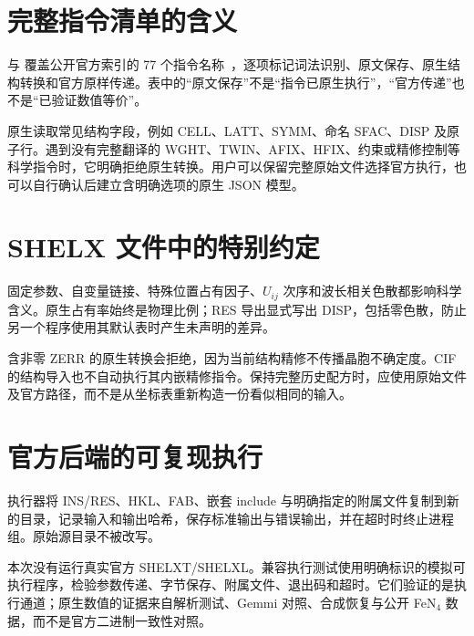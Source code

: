 \section{完整指令清单的含义}
 与  覆盖公开官方索引的 77 个指令名称~\cite{shelxl_instructions}，逐项标记词法识别、原文保存、原生结构转换和官方原样传递。表中的“原文保存”不是“指令已原生执行”，“官方传递”也不是“已验证数值等价”。

原生读取常见结构字段，例如 CELL、LATT、SYMM、命名 SFAC、DISP 及原子行。遇到没有完整翻译的 WGHT、TWIN、AFIX、HFIX、约束或精修控制等科学指令时，它明确拒绝原生转换。用户可以保留完整原始文件选择官方执行，也可以自行确认后建立含明确选项的原生 JSON 模型。

\section{SHELX 文件中的特别约定}
固定参数、自变量链接、特殊位置占有因子、$U_{ij}$ 次序和波长相关色散都影响科学含义。原生占有率始终是物理比例；RES 导出显式写出 DISP，包括零色散，防止另一个程序使用其默认表时产生未声明的差异。

含非零 ZERR 的原生转换会拒绝，因为当前结构精修不传播晶胞不确定度。CIF 的结构导入也不自动执行其内嵌精修指令。保持完整历史配方时，应使用原始文件及官方路径，而不是从坐标表重新构造一份看似相同的输入。

\section{官方后端的可复现执行}
执行器将 INS/RES、HKL、FAB、嵌套 include 与明确指定的附属文件复制到新的目录，记录输入和输出哈希，保存标准输出与错误输出，并在超时时终止进程组。原始源目录不被改写。

本次没有运行真实官方 SHELXT/SHELXL。兼容执行测试使用明确标识的模拟可执行程序，检验参数传递、字节保存、附属文件、退出码和超时。它们验证的是执行通道；原生数值的证据来自解析测试、Gemmi 对照、合成恢复与公开 FeN$_4$ 数据，而不是官方二进制一致性对照。
